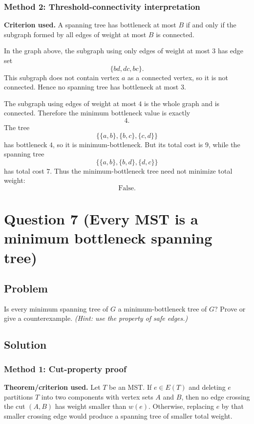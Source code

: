 \documentclass[12pt]{article}
\begin{document}
\subsubsection{Method 2: Threshold-connectivity interpretation}
\textbf{Criterion used.} A spanning tree has bottleneck at most $B$ if and only if the subgraph formed by all edges of weight at most $B$ is connected.

In the graph above, the subgraph using only edges of weight at most $3$ has edge set
\[
  \{bd,dc,bc\}.
\]
This subgraph does not contain vertex $a$ as a connected vertex, so it is not connected. Hence no spanning tree has bottleneck at most $3$.

The subgraph using edges of weight at most $4$ is the whole graph and is connected. Therefore the minimum bottleneck value is exactly
\[
  4.
\]
The tree
\[
  \{\{a,b\},\{b,c\},\{c,d\}\}
\]
has bottleneck $4$, so it is minimum-bottleneck. But its total cost is $9$, while the spanning tree
\[
  \{\{a,b\},\{b,d\},\{d,c\}\}
\]
has total cost $7$. Thus the minimum-bottleneck tree need not minimize total weight:
\[
  \boxed{\text{False}.}
\]

\newpage
\section{Question 7 (Every MST is a minimum bottleneck spanning tree)}

\subsection{Problem}
Is every minimum spanning tree of $G$ a minimum-bottleneck tree of $G$? Prove or give a counterexample. \textit{(Hint: use the property of safe edges.)}

\subsection{Solution}

\subsubsection{Method 1: Cut-property proof}
\textbf{Theorem/criterion used.} Let $T$ be an MST. If $e\in E(T)$ and deleting $e$ partitions $T$ into two components with vertex sets $A$ and $B$, then no edge crossing the cut $(A,B)$ has weight smaller than $w(e)$. Otherwise, replacing $e$ by that smaller crossing edge would produce a spanning tree of smaller total weight.
\end{document}
